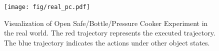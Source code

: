 \begin{figure}[htbp]
  \centering
  \texttt{[image: fig/real\_pc.pdf]}
  \vspace{-1cm}
  \caption{Visualization of Open Safe/Bottle/Pressure Cooker Experiment in the real world. The red trajectory represents the executed trajectory. The blue trajectory indicates the actions under other object states.
  }
  \label{fig:real_other}
\end{figure}

